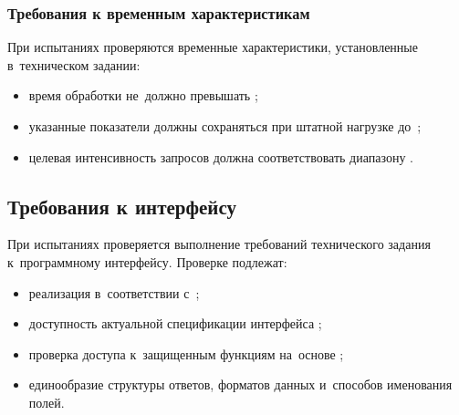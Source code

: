 \documentclass[12pt,a4paper]{extarticle}
\begin{document}
\subsubsection{Требования к временным характеристикам}

\begin{hseExample}
При испытаниях проверяются временные характеристики, установленные в~техническом задании:

\begin{itemize}[leftmargin=1.25cm]
    \item время обработки  не~должно превышать ;
    \item указанные показатели должны сохраняться при штатной нагрузке до~;
    \item целевая интенсивность запросов должна соответствовать диапазону .
\end{itemize}
\end{hseExample}

\subsection{Требования к интерфейсу}

\begin{hseExample}
При испытаниях проверяется выполнение требований технического задания к~программному интерфейсу. Проверке подлежат:

\begin{itemize}[leftmargin=1.25cm]
    \item реализация  в~соответствии с~;
    \item доступность актуальной спецификации интерфейса ;
    \item проверка доступа к~защищенным функциям на~основе ;
    \item единообразие структуры ответов, форматов данных и~способов именования полей.
\end{itemize}
\end{hseExample}
\end{document}
